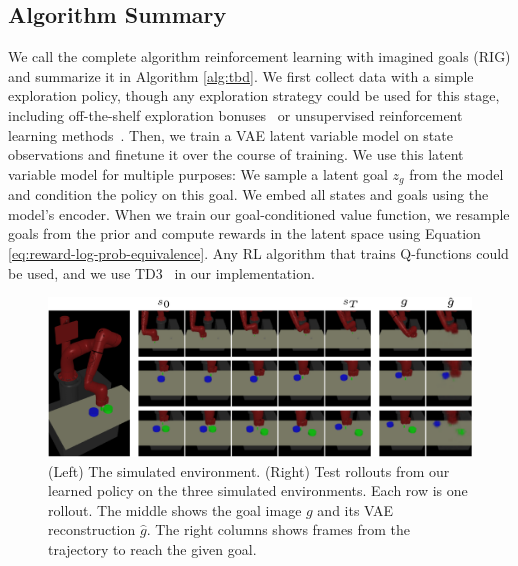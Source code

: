 \subsection{Algorithm Summary}
\label{sec:alg_summary}

We call the complete algorithm reinforcement learning with imagined goals (RIG) and summarize it in Algorithm \ref{alg:tbd}.
We first collect data with a simple exploration policy, though any exploration strategy could be used for this stage, including off-the-shelf exploration bonuses~\citep{pathak2017curiosity, bellemare2016unifying} or unsupervised reinforcement learning methods~\citep{eysenbach2018diayn, florensa2017stochastic}.
Then, we train a VAE latent variable model on state observations and finetune it over the course of training.
We use this latent variable model for multiple purposes:
We sample a latent goal $z_g$ from the model and condition the policy on this goal.
We embed all states and goals using the model's encoder.
When we train our goal-conditioned value function, we resample goals from the prior and compute rewards in the latent space using Equation \eqref{eq:reward-log-prob-equivalence}.
Any RL algorithm that trains Q-functions could be used, and we use TD3~\citep{fujimoto2018td3} in our implementation.

\begin{figure}
    \centering
    \includegraphics[width=0.99\linewidth]{rig/img/nips18_fig_rollouts-crop.pdf}
    \caption{(Left) The simulated environment. (Right) Test rollouts from our learned policy on the three simulated environments. Each row is one rollout. The middle shows the goal image $g$ and its VAE reconstruction $\hat g$. The right columns shows frames from the trajectory to reach the given goal.}
    \vspace{-0.1in}
    \label{fig:sim_screenshot}
\end{figure}


